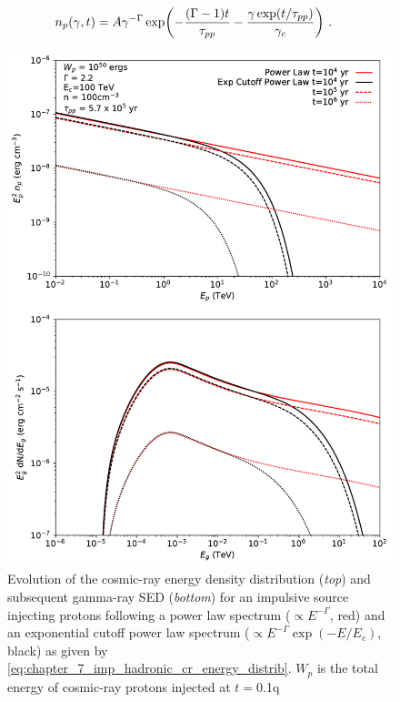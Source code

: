 \begin{equation}
    \begin{aligned}
       	n_p\qty(\gamma,t)&=A\gamma^{-\Gamma}\exp(-\frac{\qty(\Gamma-1)t}{\tau_{pp}}-\frac{\gamma\exp(t/\tau_{pp})}{\gamma_c})\text{ .}
    \end{aligned} \label{eq:chapter_7_imp_hadronic_cr_energy_distrib}
\end{equation}
\begin{figure}[hbtp]
	\centering
	\includegraphics[width=1.0\textwidth]{07_Particle_Evolution/Images/evolution/impulsive_proton_total_spectrum.pdf}
	\caption{Evolution of the cosmic-ray energy density distribution (\textit{top}) and subsequent gamma-ray SED (\textit{bottom}) for an impulsive source injecting protons following a power law spectrum ($\propto E^{-\Gamma}$, red) and an exponential cutoff power law spectrum ($\propto E^{-\Gamma}\exp(-E/E_c)$, black) as given by \autoref{eq:chapter_7_imp_hadronic_cr_energy_distrib}. $W_p$ is the total energy of cosmic-ray protons injected at $t=0$.1q}
	\label{fig:chapter_7_impulsive_hadron_cr_spectrum}
\end{figure}

